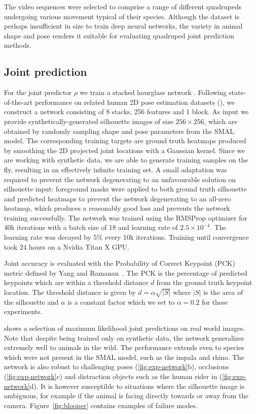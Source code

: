 The video sequences were selected to comprise a range of different quadrupeds undergoing various movement typical of their species. Although the dataset is perhaps insufficient in size to train deep neural networks, the variety in animal shape and pose renders it suitable for evaluating quadruped joint prediction methods. 

\subsection{Joint prediction}
\label{sec:exp-network}
For the joint predictor $\rho$ we train a stacked hourglass network \cite{newell2016stacked}. Following state-of-the-art performance on related human 2D pose estimation datasets (\cite{andriluka14cvpr,lin2014microsoft}), we construct a network consisting of 8 stacks, 256 features and 1 block. As input we provide synthetically-generated silhouette images of size $256\times 256$, which are obtained by randomly sampling shape and pose parameters from the SMAL model. The corresponding training targets are ground truth heatmaps produced by smoothing the 2D projected joint locations with a Gaussian kernel. Since we are working with synthetic data, we are able to generate training samples on the fly, resulting in an effectively infinite training set. A small adaptation was required to prevent the network degenerating to an unfavourable solution on silhouette input: foreground masks were applied to both ground truth silhouette and predicted heatmaps to prevent the network degenerating to an all-zero heatmap, which produces a reasonably good loss and prevents the network training successfully. The network was trained using the RMSProp optimizer for 40k iterations with a batch size of 18 and learning rate of $2.5\times 10^{-4}$. The learning rate was decayed by 5\% every 10k iterations. Training until convergence took 24 hours on a Nvidia Titan X GPU.

Joint accuracy is evaluated with the Probability of Correct Keypoint (PCK) metric defined by Yang and Ramanan~\cite{yang2013articulated}. The PCK is the percentage of predicted keypoints which are within a threshold distance $d$ from the ground truth keypoint location. The threshold distance is given by $d=\alpha\sqrt{|S|}$ where $|S|$ is the area of the silhouette and $\alpha$ is a constant factor which we set to $\alpha=0.2$ for these experiments.

 shows a selection of maximum likelihood joint predictions on real world images. Note that despite being trained only on synthetic data, the network generalizes extremely well to animals in the wild. The performance extends even to species which were not present in the SMAL model, such as the impala and rhino. The network is also robust to challenging poses (\ref{fig:exp-network}b), occlusions (\ref{fig:exp-network}c) and distraction objects such as the human rider in (\ref{fig:exp-network}d). It is however susceptible to situations where the silhouette image is ambiguous, for example if the animal is facing directly towards or away from the camera. Figure~\ref{fig:blooper} contains examples of failure modes.

